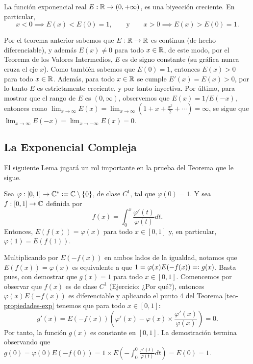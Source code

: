 \begin{theo}\label{teo-exponencial-real}
    La función exponencial real $E: \mathbb{R} \rightarrow (0, +\infty)$, es una biyección creciente. En particular, 
    \[
    x<0 \implies E(x) < E(0) = 1, \qquad \text{y} \qquad x>0 \implies E(x) > E(0) = 1. 
    \]
\end{theo}
\begin{dem}
    Por el teorema anterior sabemos que $E: \mathbb{R} \rightarrow \mathbb{R}$ es continua (de hecho diferenciable), y además $E(x)\neq 0$ 
    para todo $x\in \mathbb{R}$, de este modo, por el Teorema de los Valores Intermedios, $E$ es de signo constante (su gráfica nunca cruza el eje $x$). Como
    también sabemos que $E(0) = 1$, entonces $E(x) > 0$ para todo $x\in \mathbb{R}$. Además, para todo $x\in \mathbb{R}$ se cumple 
    $E'(x) = E(x)>0$, por lo tanto $E$ es estrictamente creciente, y por tanto inyectiva. Por último, para mostrar que el rango de $E$ es $(0, \infty)$,
    observemos que $E(x) = 1/E(-x)$, entonces como 
    $\displaystyle\lim_{x \rightarrow \infty} E(x) = \lim_{x\rightarrow \infty} (1+x+\frac{x^2}{2} + \cdots) = \infty$,
    se sigue que $\displaystyle\lim_{x\rightarrow \infty} E(-x) = \lim_{x\rightarrow -\infty} E(x) = 0$. 
\end{dem}

\subsection{La Exponencial Compleja}
El siguiente Lema jugará un rol importante en la prueba del Teorema que le sigue.
\begin{lemma} \label{lema:integral-derivada-logaritmica}
  Sea $\varphi : [0,1]\rightarrow \mathbb{C}^{*} \vcentcolon = \mathbb{C} \setminus \{0\}$, de clase $C^1$, tal que \(\varphi(0) =1\). Y sea 
  \(f: [0,1] \rightarrow \mathbb{C}\) definida por
  \[
  f(x) = \int_{0}^{x} \frac{\varphi'(t)}{\varphi(t)}dt.
  \]
Entonces, \(E(f(x)) = \varphi(x)\) para todo \(x\in [0,1]\) y, en particular, \(\varphi(1)=E(f(1))\).
\end{lemma}
\begin{dem}
  Multiplicando por \(E(-f(x))\) en ambos lados de la igualdad, notamos que \(E(f(x)) = \varphi(x)\) es equivalente a que $1 = \varphi(x)E(-f(x))= \vcentcolon g(x)$. 
  Basta pues, con demostrar que \(g(x) = 1\) para todo \(x\in [0,1]\).
  Comencemos por observar que \(f(x)\) es de clase $C^1$ (Ejercicio: ¿Por qué?), entonces \(\varphi(x)E(-f(x))\) es diferenciable y
  aplicando el punto 4 del Teorema \ref{teo-propiedades-exp} tenemos que para todo \(x \in [0,1]\):
  \[
  g'(x) = E(-f(x))\left(\varphi'(x) - \varphi(x)\times \frac{\varphi'(x)}{\varphi(x)} \right) = 0.
  \]
  Por tanto, la función \(g(x)\) es constante en \([0,1]\). La demostración termina observando que 
  \(g(0) = \varphi(0)E(-f(0)) = 1\times E(- \int_{0}^{0} \frac{\varphi'(t)}{\varphi(t)}dt) = E(0) =1.\) 
\end{dem}

